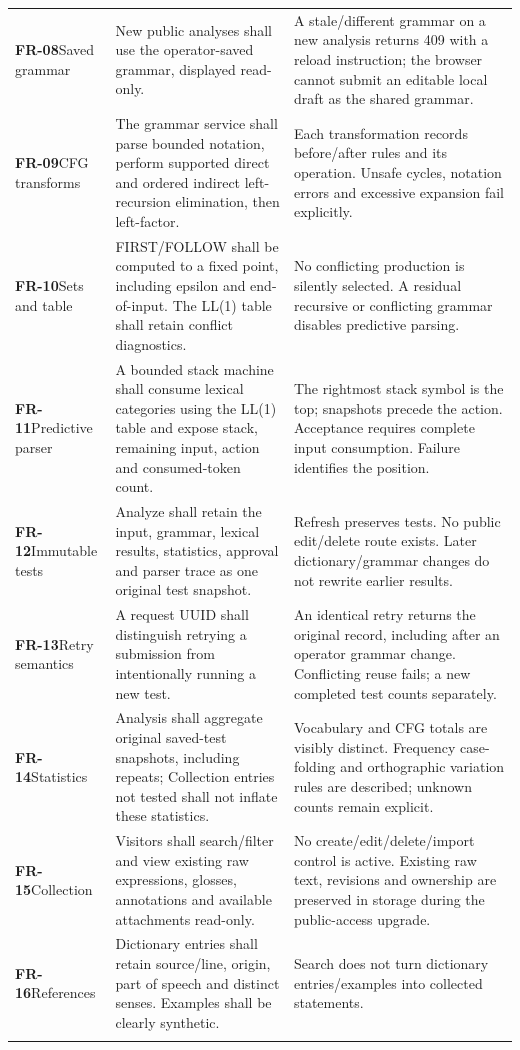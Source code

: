 \documentclass[11pt]{article}
\newcommand{\req}[4]{\textbf{#1}\newline #2 & #3 & #4\\\addlinespace}
\begin{document}
\begin{longtable}{L{2.0cm}L{6.1cm}L{6.1cm}}
\req{FR-08}{Saved grammar}
{New public analyses shall use the operator-saved grammar, displayed read-only.}
{A stale/different grammar on a new analysis returns 409 with a reload instruction;
the browser cannot submit an editable local draft as the shared grammar.}
\req{FR-09}{CFG transforms}
{The grammar service shall parse bounded notation, perform supported direct
and ordered indirect left-recursion elimination, then left-factor.}
{Each transformation records before/after rules and its operation.
Unsafe cycles, notation errors and excessive expansion fail explicitly.}
\req{FR-10}{Sets and table}
{FIRST/FOLLOW shall be computed to a fixed point, including epsilon and
end-of-input. The LL(1) table shall retain conflict diagnostics.}
{No conflicting production is silently selected. A residual recursive or
conflicting grammar disables predictive parsing.}
\req{FR-11}{Predictive parser}
{A bounded stack machine shall consume lexical categories using the LL(1)
table and expose stack, remaining input, action and consumed-token count.}
{The rightmost stack symbol is the top; snapshots precede the action.
Acceptance requires complete input consumption. Failure identifies the position.}
\req{FR-12}{Immutable tests}
{Analyze shall retain the input, grammar, lexical results, statistics,
approval and parser trace as one original test snapshot.}
{Refresh preserves tests. No public edit/delete route exists.
Later dictionary/grammar changes do not rewrite earlier results.}
\req{FR-13}{Retry semantics}
{A request UUID shall distinguish retrying a submission from intentionally
running a new test.}
{An identical retry returns the original record, including after an operator
grammar change. Conflicting reuse fails; a new completed test counts separately.}
\req{FR-14}{Statistics}
{Analysis shall aggregate original saved-test snapshots, including repeats;
Collection entries not tested shall not inflate these statistics.}
{Vocabulary and CFG totals are visibly distinct. Frequency case-folding and
orthographic variation rules are described; unknown counts remain explicit.}
\req{FR-15}{Collection}
{Visitors shall search/filter and view existing raw expressions, glosses,
annotations and available attachments read-only.}
{No create/edit/delete/import control is active. Existing raw text, revisions
and ownership are preserved in storage during the public-access upgrade.}
\req{FR-16}{References}
{Dictionary entries shall retain source/line, origin, part of speech and
distinct senses. Examples shall be clearly synthetic.}
{Search does not turn dictionary entries/examples into collected statements.
}
\end{longtable}
\end{document}
